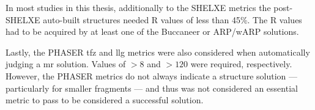 In most studies in this thesis, additionally to the SHELXE metrics the post-SHELXE auto-built structures needed R values of less than 45\%. The R values had to be acquired by at least one of the Buccaneer \cite{Cowtan2006-xv} or ARP/wARP \cite{Cohen2008-wg} solutions.

Lastly, the PHASER \gls{tfz} and \gls{llg} metrics were also considered when automatically judging a \gls{mr} solution. Values of $>8$ and $>120$ were required, respectively. However, the PHASER metrics do not always indicate a structure solution --- particularly for smaller fragments --- and thus was not considered an essential metric to pass to be considered a successful solution.
